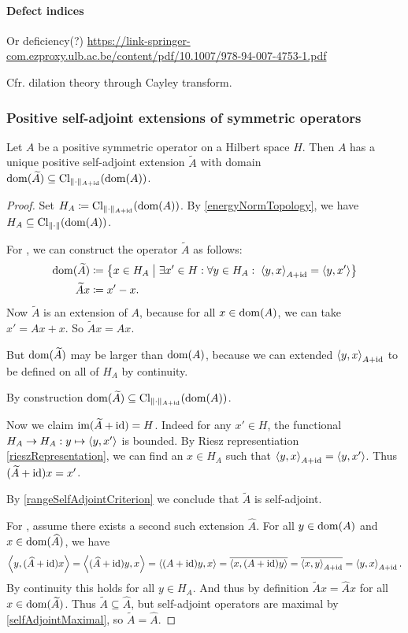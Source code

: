 \paragraph{Defect indices}
Or deficiency(?)
\url{https://link-springer-com.ezproxy.ulb.ac.be/content/pdf/10.1007/978-94-007-4753-1.pdf}

Cfr. dilation theory through Cayley transform.

\subsubsection{Positive self-adjoint extensions of symmetric operators}
\begin{theorem}
Let $A$ be a positive symmetric operator on a Hilbert space $H$. Then $A$ has a unique positive self-adjoint extension $\widetilde{A}$ with domain $\operatorname{dom}(\widetilde{A}) \subseteq \operatorname{Cl}_{\lVert\cdot\rVert_{A+\operatorname{id}}}(\operatorname{dom}(A))$.
\end{theorem}
\begin{proof}
Set $H_A \coloneqq \operatorname{Cl}_{\lVert\cdot\rVert_{A+\operatorname{id}}}(\operatorname{dom}(A))$. By \ref{energyNormTopology}, we have $H_A \subseteq \operatorname{Cl}_{\lVert\cdot\rVert}(\operatorname{dom}(A))$.

For , we can construct the operator $\widetilde{A}$ as follows:
\begin{align*}
\operatorname{dom}(\widetilde{A}) &\coloneqq \left\{ x\in H_A \;\middle|\; \exists x'\in H:\forall y\in H_A:\; \left\langle y,x \right\rangle_{A+\operatorname{id}} = \left\langle y,x' \right\rangle \right\} \\
\widetilde{A}x &\coloneqq x' - x.
\end{align*}
Now $\widetilde{A}$ is an extension of $A$, because for all $x\in \operatorname{dom}(A)$, we can take $x' = Ax + x$. So $\widetilde{A}x = Ax$.

But $\operatorname{dom}(\widetilde{A})$ may be larger than $\operatorname{dom}(A)$, because we can extended $\left\langle y,x \right\rangle_{A+\operatorname{id}}$ to be defined on all of $H_A$ by continuity.

By construction $\operatorname{dom}(\widetilde{A}) \subseteq \operatorname{Cl}_{\lVert\cdot\rVert_{A+\operatorname{id}}}(\operatorname{dom}(A))$.

Now we claim $\operatorname{im}(\widetilde{A} + \operatorname{id}) = H$. Indeed for any $x'\in H$, the functional $H_A \to H_A: y\mapsto \left\langle y,x' \right\rangle$ is bounded. By Riesz representiation \ref{rieszRepresentation}, we can find an $x\in H_A$ such that $\left\langle y,x \right\rangle_{A+\operatorname{id}} = \left\langle y,x' \right\rangle$. Thus $(\widetilde{A} + \operatorname{id})x = x'$.

By \ref{rangeSelfAdjointCriterion} we conclude that $\widetilde{A}$ is self-adjoint. 

For , assume there exists a second such extension $\widehat{A}$. For all $y\in \operatorname{dom}(A)$ and $x\in \operatorname{dom}(\widehat{A})$, we have
\[ \left\langle y, (\widehat{A}+\operatorname{id})x \right\rangle = \left\langle (\widehat{A}+\operatorname{id})y, x \right\rangle = \left\langle (A+\operatorname{id})y, x \right\rangle = \overline{\left\langle x, (A+\operatorname{id})y \right\rangle} = \overline{\left\langle x, y \right\rangle_{A+\operatorname{id}}} = \left\langle y, x \right\rangle_{A+\operatorname{id}}. \]
By continuity this holds for all $y\in H_A$. And thus by definition $\widetilde{A}x = \widehat{A}x$ for all $x\in\operatorname{dom}(\widetilde{A})$. Thus $\widetilde{A} \subseteq \widehat{A}$, but self-adjoint operators are maximal by \ref{selfAdjointMaximal}, so $\widetilde{A} = \widehat{A}$.
\end{proof}


